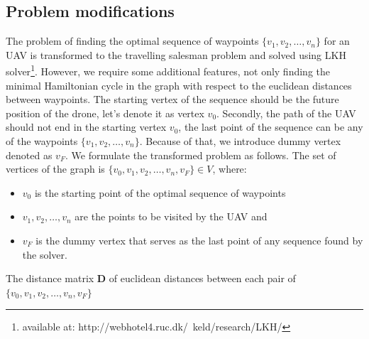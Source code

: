 \subsection{Problem modifications}
The problem of finding the optimal sequence of waypoints $\{v_{1}, v_{2}, \dots , v_{n}\}$ for an \ac{UAV} is transformed to the travelling salesman problem and solved using LKH solver\footnote{available at: http://webhotel4.ruc.dk/~keld/research/LKH/}.
However, we require some additional features, not only finding the minimal Hamiltonian cycle in the graph with respect to the euclidean distances between waypoints.
The starting vertex of the sequence should be the future position of the drone, let's denote it as vertex $v_{0}$.
Secondly, the path of the \ac{UAV} should not end in the starting vertex $v_{0}$, the last point of the sequence can be any of the waypoints $\{v_{1}, v_{2}, \dots, v_{n}\}$.
Because of that, we introduce dummy vertex denoted as $v_{F}$.
We formulate the transformed problem as follows.
The set of vertices of the graph is $\{v_{0}, v_{1}, v_{2}, \dots,v_{n}, v_{F}\} \in V$, where: 
\begin{itemize}
  \item $v_{0}$ is the starting point of the optimal sequence of waypoints
  \item $v_{1}, v_{2}, \dots, v_{n}$ are the points to be visited by the \ac{UAV} and   
  \item $v_{F}$ is the dummy vertex that serves as the last point of any sequence found by the solver.
\end{itemize}

The distance matrix $\mathbf{D}$ of euclidean distances between each pair of $\{v_{0}, v_{1}, v_{2}, \dots,v_{n},  v_{F}\}$ 

